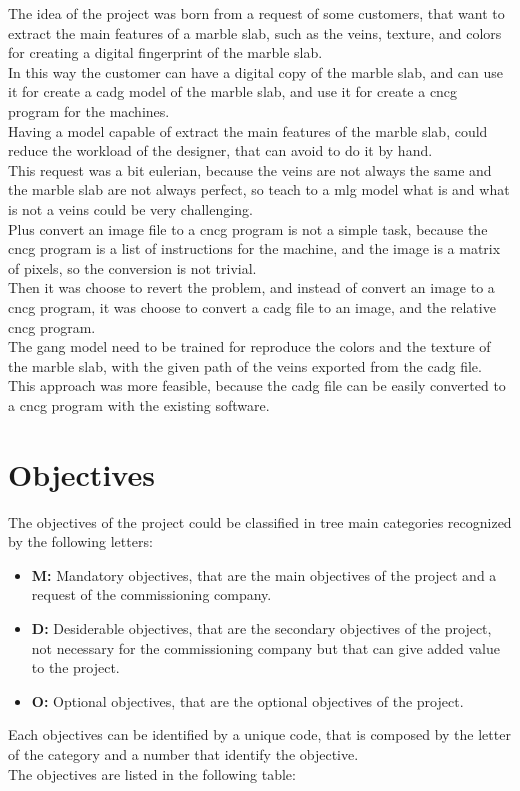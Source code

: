The idea of the project was born from a request of some customers, that want to extract the main features of a marble slab, such as the veins, texture, and colors for creating a digital
fingerprint of the marble slab.\\
In this way the customer can have a digital copy of the marble slab, and can use it for create a \gls{cadg} model of the marble slab, and use it for create a \gls{cncg} program for the machines.\\
Having a model capable of extract the main features of the marble slab, could reduce the workload of the designer, that can avoid to do it by hand.\\
This request was a bit eulerian, because the veins are not always the same and the marble slab are not always perfect, so teach to a \gls{mlg} model what is and what is not a veins could be very challenging.\\
Plus convert an image file to a \gls{cncg} program is not a simple task, because the \gls{cncg} program is a list of instructions for the machine, and the image is a matrix of pixels, so the conversion is not trivial.\\

Then it was choose to revert the problem, and instead of convert an image to a \gls{cncg} program, it was choose to convert a \gls{cadg} file to an image, and the relative \gls{cncg} program.\\
The \gls{gang} model need to be trained for reproduce the colors and the texture of the marble slab, with the given path of the veins exported from the \gls{cadg} file.\\
This approach was more feasible, because the \gls{cadg} file can be easily converted to a \gls{cncg} program with the existing software.\\

\section{Objectives}
The objectives of the project could be classified in tree main categories recognized by the following letters:
\begin{itemize}
    \item \textbf{M:} Mandatory objectives, that are the main objectives of the project and a request of the commissioning company.
    \item \textbf{D:} Desiderable objectives, that are the secondary objectives of the project, not necessary
    for the commissioning company but that can give added value to the project.
    \item \textbf{O:} Optional objectives, that are the optional objectives of the project.
\end{itemize}
Each objectives can be identified by a unique code, that is composed by the letter of the category and a number that identify the objective.\\
The objectives are listed in the following table:

